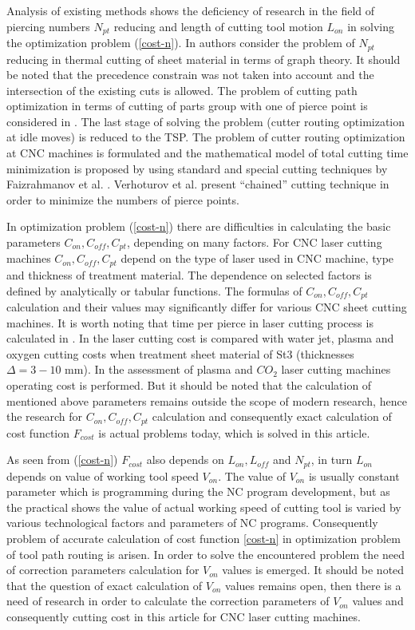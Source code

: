 \documentclass[runningheads]{llncs}
\begin{document}
Analysis of existing methods shows
the deficiency of research in the field of piercing numbers $N_{pt}$
reducing
and length of cutting tool motion  $L_{on}$
in solving the optimization problem (\ref{cost-n}).
In \cite{Manber1984Jan}
authors consider the problem of $N_{pt}$ reducing
in thermal cutting of sheet material in terms of graph theory.
It should be noted that the precedence constrain was not taken into account
and the intersection of the existing cuts is allowed.
The problem of cutting path optimization in terms of cutting of parts group
with one of pierce point is considered in \cite{ru22}.
The last stage of solving the problem
(cutter routing optimization at idle moves)
is reduced to the TSP.
The problem of cutter routing optimization at CNC machines
is formulated and the mathematical model of total cutting time minimization
is proposed by using standard and special cutting techniques
by Faizrahmanov et al. \cite{ru23}.
Verhoturov et al. \cite{ru24}
present ``chained'' cutting technique in order to
minimize the numbers of pierce points.

In optimization problem (\ref{cost-n})
there are difficulties in calculating the basic parameters
$C_{on}, C_{off}, C_{pt}$,
depending on many factors.
For CNC laser cutting machines $C_{on}, C_{off}, C_{pt}$
depend on the type of laser used in CNC machine,
type and thickness of treatment material.
The dependence on selected factors is defined by analytically or tabular functions.
The formulas of $C_{on}, C_{off}, C_{pt}$
calculation and their values may significantly differ for various CNC sheet cutting machines.
It is worth noting that time per pierce in laser cutting process is calculated in \cite{ru06}.
In \cite{ru07} the laser cutting cost is compared with water jet,
plasma and oxygen cutting costs when treatment sheet material of St3
(thicknesses $\Delta=3-10$ mm).
In \cite{ru08} the assessment of plasma and $CO_2$ laser cutting machines operating cost is performed.
But it should be noted that the calculation of mentioned above parameters
remains outside the scope of modern research,
hence the research for $C_{on}, C_{off}, C_{pt}$
calculation and consequently exact calculation of cost function $F_{cost}$
is actual problems today, which is solved in this article.

As seen from (\ref{cost-n})
$F_{cost}$
also depends on
$L_{on}, L_{off}$ and $N_{pt}$,
in turn $L_{on}$ depends on value of working tool speed $V_{on}$.
The value of $V_{on}$ is usually constant parameter
which is programming during the NC program development,
but as the practical shows \cite{ru09,Tavaeva2015Nov}
the value of actual working speed of cutting tool
is varied by various technological factors and parameters of NC programs.
Consequently problem of accurate calculation of cost function \ref{cost-n}
in optimization problem of tool path routing is arisen.
In order to solve the encountered problem
the need of correction parameters calculation for $V_{on}$
values is emerged.
It should be noted that
the question of exact calculation of  $V_{on}$ values remains open,
then there is a need of research in order to calculate the correction parameters of  $V_{on}$
values and consequently cutting cost in this article for CNC laser cutting machines.
\end{document}
